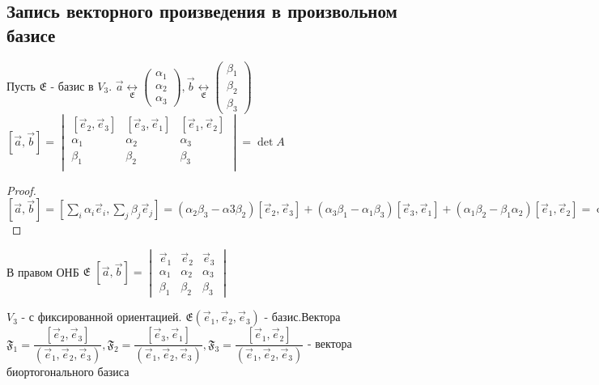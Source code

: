 \subsection{Запись векторного произведения в произвольном базисе}
\begin{theorem}
	Пусть \(\mathfrak{E}\) - базис в \(V_3\). \(\vec a \underset{\mathfrak{E}}{\longleftrightarrow}\begin{pmatrix}
		\alpha_1 \\ \alpha_2 \\ \alpha_3 
	\end{pmatrix}, 
	\vec b \underset{\mathfrak{E}}{\longleftrightarrow}\begin{pmatrix}
		\beta_1 \\ \beta_2 \\ \beta_3 
	\end{pmatrix}
	\) \newline
	\([\vec a, \vec b] = \begin{vmatrix}
		[\vec e_2, \vec e_3] & [\vec e_3, \vec e_1] & [\vec e_1, \vec e_2] \\
		\alpha_1 & \alpha_2 & \alpha_3 \\
		\beta_1 & \beta_2 & \beta_3 \\
	\end{vmatrix} = \det A\)
\end{theorem}
\begin{proof}
	\([\vec a, \vec b] = [\sum_i \alpha_i\vec e_i, \sum_j \beta_j\vec e_j] = (\alpha_2\beta_3 - \alpha3\beta_2)[\vec e_2, \vec e_3] + (\alpha_3\beta_1 -\alpha_1\beta_3)[\vec e_3, \vec e_1] + (\alpha_1\beta_2 - \beta_1\alpha_2)[\vec e_1, \vec e_2] = \det A\)
\end{proof}
\begin{corollary}
	В правом ОНБ \(\mathfrak{E}\) \newline
	\([\vec a, \vec b] = \begin{vmatrix}
		\vec e_1 & \vec e_2 & \vec e_3 \\
		\alpha_1 & \alpha_2 & \alpha_3 \\
		\beta_1 & \beta_2 & \beta_3
	\end{vmatrix}\)
\end{corollary}
\begin{definition}
	\(V_3\) - с фиксированной ориентацией. \(\mathfrak{E}(\vec e_1, \vec e_2, \vec e_3)\) - базис.\newline Вектора \(\mathfrak{F_1} = \dfrac{[\vec e_2, \vec e_3]}{(\vec e_1, \vec e_2, \vec e_3)}, \mathfrak{F_2} = \dfrac{[\vec e_3, \vec e_1]}{(\vec e_1, \vec e_2, \vec e_3)}, 
	\mathfrak{F_3} = \dfrac{[\vec e_1, \vec e_2]}{(\vec e_1, \vec e_2, \vec e_3)}\) -  вектора биортогонального базиса
\end{definition}
